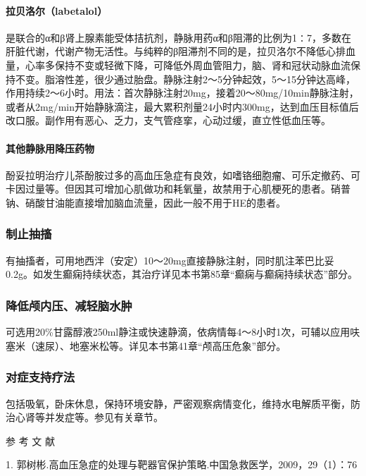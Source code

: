 \paragraph{拉贝洛尔（labetalol）}

是联合的α和β肾上腺素能受体拮抗剂，静脉用药α和β阻滞的比例为1∶7，多数在肝脏代谢，代谢产物无活性。与纯粹的β阻滞剂不同的是，拉贝洛尔不降低心排血量，心率多保持不变或轻微下降，可降低外周血管阻力，脑、肾和冠状动脉血流保持不变。脂溶性差，很少通过胎盘。静脉注射2～5分钟起效，5～15分钟达高峰，作用持续2～6小时。用法：首次静脉注射20mg，接着20～80mg/10min静脉注射，或者从2mg/min开始静脉滴注，最大累积剂量24小时内300mg，达到血压目标值后改口服。副作用有恶心、乏力，支气管痉挛，心动过缓，直立性低血压等。

\paragraph{其他静脉用降压药物}

酚妥拉明治疗儿茶酚胺过多的高血压急症有良效，如嗜铬细胞瘤、可乐定撤药、可卡因过量等。但因其可增加心肌做功和耗氧量，故禁用于心肌梗死的患者。硝普钠、硝酸甘油能直接增加脑血流量，因此一般不用于HE的患者。

\subsubsection{制止抽搐}

有抽搐者，可用地西泮（安定）10～20mg直接静脉注射，同时肌注苯巴比妥0.2g。如发生癫痫持续状态，其治疗详见本书第85章“癫痫与癫痫持续状态”部分。

\subsubsection{降低颅内压、减轻脑水肿}

可选用20\%甘露醇液250ml静注或快速静滴，依病情每4～8小时1次，可辅以应用呋塞米（速尿）、地塞米松等。详见本书第41章“颅高压危象”部分。

\subsubsection{对症支持疗法}

包括吸氧，卧床休息，保持环境安静，严密观察病情变化，维持水电解质平衡，防治心肾等并发症等。参见有关章节。
\protect\hypertarget{text00098.html}{}{}

\hypertarget{text00098.htmlux5cux23CHP4-1-4}{}
参 考 文 献

1.
郭树彬.高血压急症的处理与靶器官保护策略.中国急救医学，2009，29（1）：76

